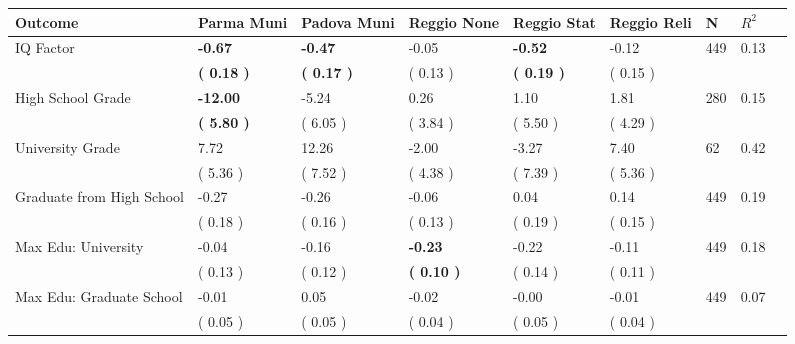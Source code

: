 \begin{tabular}{L{6.2cm} C{1.8cm} C{1.8cm} C{1.8cm} C{1.8cm} C{1.8cm} C{1.8cm} C{0.3cm} C{0.3cm}}
\toprule
 \textbf{Outcome} & \textbf{Parma Muni} & \textbf{Padova Muni} & \textbf{Reggio None} & \textbf{Reggio Stat} & \textbf{Reggio Reli} & \textbf{N} & \textbf{$ R^2$} \\
\midrule
IQ Factor & \textbf{    -0.67} & \textbf{    -0.47} &     -0.05 & \textbf{    -0.52} &     -0.12  & 449 &       0.13 \\ 
 & \textbf{(     0.18 )} & \textbf{(     0.17 )} & (     0.13 ) & \textbf{(     0.19 )} & (     0.15 )  & \\
High School Grade & \textbf{   -12.00} &     -5.24 &      0.26 &      1.10 &      1.81  & 280 &       0.15 \\ 
 & \textbf{(     5.80 )} & (     6.05 ) & (     3.84 ) & (     5.50 ) & (     4.29 )  & \\
University Grade &      7.72 &     12.26 &     -2.00 &     -3.27 &      7.40  & 62 &       0.42 \\ 
 & (     5.36 ) & (     7.52 ) & (     4.38 ) & (     7.39 ) & (     5.36 )  & \\
Graduate from High School &     -0.27 &     -0.26 &     -0.06 &      0.04 &      0.14  & 449 &       0.19 \\ 
 & (     0.18 ) & (     0.16 ) & (     0.13 ) & (     0.19 ) & (     0.15 )  & \\
Max Edu: University &     -0.04 &     -0.16 & \textbf{    -0.23} &     -0.22 &     -0.11  & 449 &       0.18 \\ 
 & (     0.13 ) & (     0.12 ) & \textbf{(     0.10 )} & (     0.14 ) & (     0.11 )  & \\
Max Edu: Graduate School &     -0.01 &      0.05 &     -0.02 &     -0.00 &     -0.01  & 449 &       0.07 \\ 
 & (     0.05 ) & (     0.05 ) & (     0.04 ) & (     0.05 ) & (     0.04 )  & \\
\bottomrule
\end{tabular}
